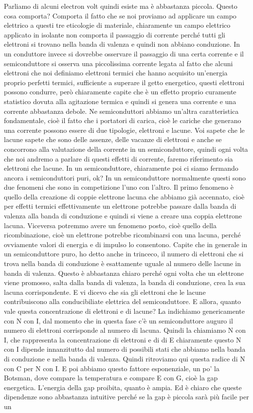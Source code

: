 Parliamo di alcuni electron volt quindi esiste ma è abbastanza piccola. Questo cosa comporta? Comporta il fatto che se noi proviamo ad applicare un campo elettrico a questi tre eticologie di materiale, chiaramente un campo elettrico applicato in isolante non comporta il passaggio di corrente perché tutti gli elettroni si trovano nella banda di valenza e quindi non abbiano conduzione. In un conduttore invece si dovrebbe osservare il passaggio di una certa corrente e il semiconduttore si osserva una piccolissima corrente legata al fatto che alcuni elettroni che noi definiamo elettroni termici che hanno acquisito un'energia proprio perfetti termici, sufficiente a superare il getto energetico, questi elettroni possono condurre, però chiaramente capite che è un effetto proprio curamente statistico dovuta alla agitazione termica e quindi si genera una corrente e una corrente abbastanza debole. Ne semiconduttori abbiamo un'altra caratteristica fondamentale, cioè il fatto che i portatori di carica, cioè le cariche che generano una corrente possono essere di due tipologie, elettroni e lacune. Voi sapete che le lacune sapete che sono delle assenze, delle vacanze di elettroni e anche se concorrono alla valutazione della corrente in un semiconduttore, quindi ogni volta che noi andremo a parlare di questi effetti di corrente, faremo riferimento sia elettroni che lacune. In un semiconduttore, chiaramente poi ci siamo fermando ancora i semiconduttori puri, ok? In un semiconduttore normalmente questi sono due fenomeni che sono in competizione l'uno con l'altro. Il primo fenomeno è quello della creazione di coppie elettrone lacuna che abbiamo già accennato, cioè per effetti termici effettivamente un elettrone potrebbe passare dalla banda di valenza alla banda di conduzione e quindi si viene a creare una coppia elettrone lacuna. Viceversa potremmo avere un fenomeno posto, cioè quello della ricombinazione, cioè un elettrone potrebbe ricombinarsi con una lacuna, perché ovviamente valori di energia e di impulso lo consentono. Capite che in generale in un semiconduttore puro, ho detto anche in trinceco, il numero di elettroni che si trova nella banda di conduzione è esattamente uguale al numero delle lacune in banda di valenza. Questo è abbastanza chiaro perché ogni volta che un elettrone viene promosso, salta dalla banda di valenza, la banda di conduzione, crea la sua lacuna corrispondente. E vi dicevo che sia gli elettroni che le lacune contribuiscono alla conducibiliate elettrica del semiconduttore. E allora, quanto vale questa concentrazione di elettroni e di lacune? La indichiamo genericamente con N con I, dal momento che in questa fase c'è un semiconduttore auguro il numero di elettroni corrisponde al numero di lacuna. Quindi la chiamiamo N con I, che rappresenta la concentrazione di elettroni e di di E chiaramente questo N con I dipende innanzitutto dal numero di possibili stati che abbiamo nella banda di conduzione e nella banda di valenza. Quindi ritroviamo qui questa radice di N con C per N con I. E poi abbiamo questo fattore esponenziale, un po' la Botsman, dove compare la temperatura e compare E con G, cioè la gap energetica. L'energia della gap proibita, quanto è ampia. Ed è chiaro che queste dipendenze sono abbastanza intuitive perché se la gap è piccola sarà più facile per un 